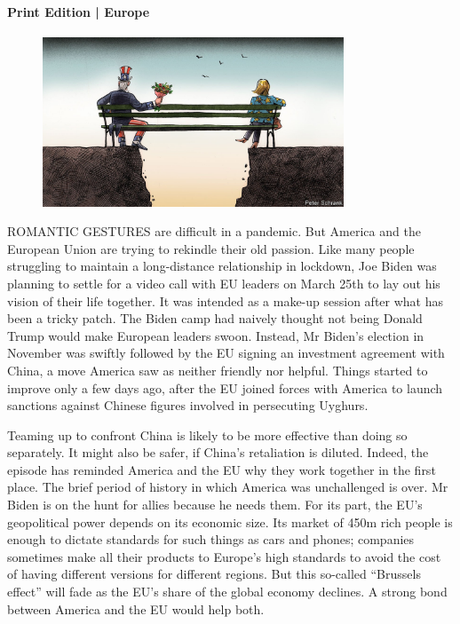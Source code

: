 \documentclass{article}
\begin{document}
\paragraph{Print Edition | Europe  \quad \color{gray}{Mar 27th 2021 }}
\begin{figure}[h]
\centering
\includegraphics[width=0.8\textwidth]{images/20210327_EUD000_0.jpg}
\end{figure}
\lettrine{R}OMANTIC GESTURES are difficult in a pandemic. But America and the European Union are trying to rekindle their old passion. Like many people struggling to maintain a long-distance relationship in lockdown, Joe Biden was planning to settle for a video call with EU leaders on March 25th to lay out his vision of their life together. It was intended as a make-up session after what has been a tricky patch. The Biden camp had naively thought not being Donald Trump would make European leaders swoon. Instead, Mr Biden's election in November was swiftly followed by the EU signing an investment agreement with China, a move America saw as neither friendly nor helpful. Things started to improve only a few days ago, after the EU joined forces with America to launch sanctions against Chinese figures involved in persecuting Uyghurs. 

Teaming up to confront China is likely to be more effective than doing so separately. It might also be safer, if China's retaliation is diluted. Indeed, the episode has reminded America and the EU why they work together in the first place. The brief period of history in which America was unchallenged is over. Mr Biden is on the hunt for allies because he needs them. For its part, the EU's geopolitical power depends on its economic size. Its market of 450m rich people is enough to dictate standards for such things as cars and phones; companies sometimes make all their products to Europe's high standards to avoid the cost of having different versions for different regions. But this so-called ``Brussels effect'' will fade as the EU's share of the global economy declines. A strong bond between America and the EU would help both. 
\end{document}
